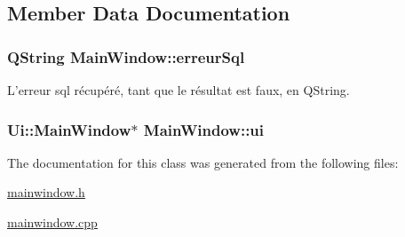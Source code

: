 \subsection{Member Data Documentation}
\hypertarget{class_main_window_a191cfb4e6409b23d8302bf840c88c364}{
\subsubsection[{erreur\-Sql}]{\setlength{\rightskip}{0pt plus 5cm}Q\-String Main\-Window\-::erreur\-Sql\hspace{0.3cm}{\ttfamily [private]}}}\label{class_main_window_a191cfb4e6409b23d8302bf840c88c364}


L'erreur sql récupéré, tant que le résultat est faux, en Q\-String. 

\hypertarget{class_main_window_a35466a70ed47252a0191168126a352a5}{
\subsubsection[{ui}]{\setlength{\rightskip}{0pt plus 5cm}Ui\-::\-Main\-Window$\ast$ Main\-Window\-::ui\hspace{0.3cm}{\ttfamily [private]}}}\label{class_main_window_a35466a70ed47252a0191168126a352a5}


The documentation for this class was generated from the following files\-:\begin{DoxyCompactItemize}
\item 
\hyperlink{mainwindow_8h}{mainwindow.\-h}\item 
\hyperlink{mainwindow_8cpp}{mainwindow.\-cpp}\end{DoxyCompactItemize}

